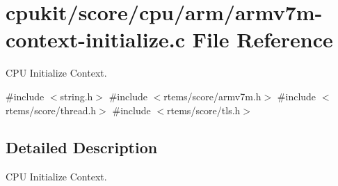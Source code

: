 \hypertarget{armv7m-context-initialize_8c}{}\section{cpukit/score/cpu/arm/armv7m-\/context-\/initialize.c File Reference}
\label{armv7m-context-initialize_8c}


C\+PU Initialize Context.  


{\ttfamily \#include $<$string.\+h$>$}\newline
{\ttfamily \#include $<$rtems/score/armv7m.\+h$>$}\newline
{\ttfamily \#include $<$rtems/score/thread.\+h$>$}\newline
{\ttfamily \#include $<$rtems/score/tls.\+h$>$}\newline


\subsection{Detailed Description}
C\+PU Initialize Context. 


